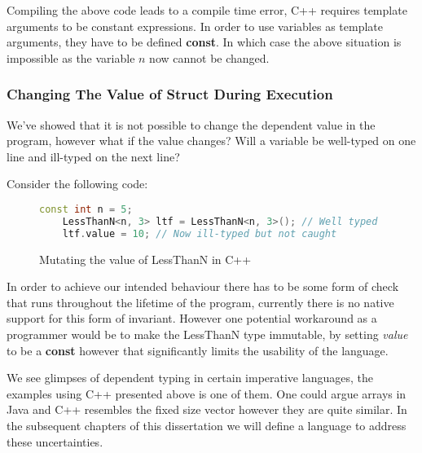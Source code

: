 \documentclass[a4paper,12pt]{report}
\begin{document}
\par
Compiling the above code leads to a compile time error, C++ requires template 
arguments to be constant expressions. In order to use variables as template 
arguments, they have to be defined \textbf{const}. In which case the above 
situation is impossible as the variable $n$ now cannot be changed. 

\subsubsection{Changing The Value of Struct During Execution}
We've showed that it is not possible to change the dependent value in 
the program, however what if the value changes? Will a 
variable be well-typed on one line and ill-typed on the next line? 

\par
Consider the following code: 
\begin{figure}[H]
  \begin{lstlisting}[language=c++]     
    const int n = 5;
    LessThanN<n, 3> ltf = LessThanN<n, 3>(); // Well typed
    ltf.value = 10; // Now ill-typed but not caught
  \end{lstlisting}
  \caption{Mutating the value of LessThanN in C++}
\end{figure}

\par
In order to achieve our intended behaviour there has to be some form of check 
that runs throughout the lifetime of the program, currently there is no native 
support for this form of invariant. However one potential workaround as a 
programmer would be to make the LessThanN type immutable, by setting \textit{value} 
to be a \textbf{const} however that significantly limits the usability of the 
language. 

\par
We see glimpses of dependent typing in certain imperative languages, the 
examples using C++ presented above is one of them. One could argue arrays in 
Java and C++ resembles the fixed size vector however they are quite similar. In 
the subsequent chapters of this dissertation we will define a language to 
address these uncertainties. 
\end{document}
